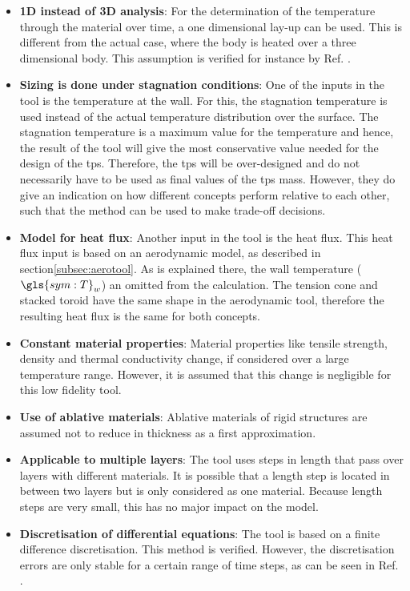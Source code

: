 \begin{itemize}
\item \textbf{1D instead of 3D analysis}: For the determination of the temperature through the material over time, a one dimensional lay-up can be used. This is different from the actual case, where the body is heated over a three dimensional body. This assumption is verified for instance by Ref. \cite{Corso2009}.
\item \textbf{Sizing is done under stagnation conditions}: One of the inputs in the tool is the temperature at the wall. For this, the stagnation temperature is used instead of the actual temperature distribution over the surface. The stagnation temperature is a maximum value for the temperature and hence, the result of the tool will give the most conservative value needed for the design of the \gls{tps}. Therefore, the \gls{tps} will be over-designed and do not necessarily have to be used as final values of the \gls{tps} mass. However, they do give an indication on how different concepts perform relative to each other, such that the method can be used to make trade-off decisions.
\item \textbf{Model for heat flux}: Another input in the tool is the heat flux. This heat flux input is based on an aerodynamic model, as described in section\ref{subsec:aerotool}. As is explained there, the wall temperature ($\gls{sym:T}_w$) an omitted from the calculation. The tension cone and stacked toroid have the same shape in the aerodynamic tool, therefore the resulting heat flux is the same for both concepts.
\item \textbf{Constant material properties}: Material properties like tensile strength, density and thermal conductivity change, if considered over a large temperature range. However, it is assumed that this change is negligible for this low fidelity tool. 
\item \textbf{Use of ablative materials}: Ablative materials of rigid structures are assumed not to reduce in thickness as a first approximation.
\item \textbf{Applicable to multiple layers}: The tool uses steps in length that pass over layers with different materials. It is possible that a length step is located in between two layers but is only considered as one material. Because length steps are very small, this has no major impact on the model.
\item \textbf{Discretisation of differential equations}: The tool is based on a finite difference discretisation. This method is verified. However, the discretisation errors are only stable for a certain range of time steps, as can be seen in Ref. \cite{Smith2011,Holman2002}. 
\end{itemize}

